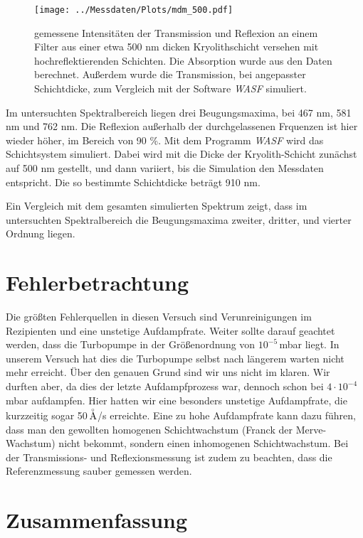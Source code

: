 \documentclass[10pt,twoside]{article}
\renewcommand{\1}{^{-1}}
\renewcommand{\2}{^{-2}}
\newcommand{\3}{^{-3}}
\newcommand{\4}{^{-4}}
\newcommand{\5}{^{-5}}
\newcommand{\6}{^{-6}}
\newcommand{\7}{^{-7}}
\newcommand{\8}{^{-8}}
\newcommand{\9}{^{-9}}
\begin{document}
\begin{figure}[h]
\centering
\texttt{[image: ../Messdaten/Plots/mdm\_500.pdf]} 
\caption{gemessene Intensitäten der Transmission und Reflexion an einem Filter aus einer etwa 500 nm dicken Kryolithschicht versehen mit hochreflektierenden Schichten. Die Absorption wurde aus den Daten berechnet. Außerdem wurde die Transmission, bei angepasster Schichtdicke, zum Vergleich mit der Software \textit{WASF} simuliert.}
\label{fig:mdm_500}
\end{figure}

Im untersuchten Spektralbereich liegen drei Beugungsmaxima, bei 467 nm, 581 nm und 762 nm.
Die Reflexion außerhalb der durchgelassenen Frquenzen ist hier wieder höher, im Bereich von 90 \%.
Mit dem Programm \textit{WASF} wird das Schichtsystem simuliert.
Dabei wird mit die Dicke der Kryolith-Schicht zunächst auf 500 nm gestellt, und dann variiert, bis die Simulation den Messdaten entspricht. Die so bestimmte Schichtdicke beträgt 910 nm.

Ein Vergleich mit dem gesamten simulierten Spektrum zeigt, dass im untersuchten Spektralbereich die Beugungsmaxima zweiter, dritter, und vierter Ordnung liegen.

\section{Fehlerbetrachtung}

Die größten Fehlerquellen in diesen Versuch sind Verunreinigungen im Rezipienten und eine unstetige Aufdampfrate. Weiter sollte darauf geachtet werden, 
dass die Turbopumpe in der Größenordnung von $10^{-5}$\,mbar liegt. In unserem Versuch hat dies die Turbopumpe selbst nach längerem warten nicht mehr erreicht. Über den genauen Grund sind wir uns nicht im klaren. Wir durften aber, da dies der letzte Aufdampfprozess war, dennoch schon bei $4\cdot 10^{-4}$\,mbar aufdampfen. 
Hier hatten wir eine besonders unstetige Aufdampfrate, die kurzzeitig sogar 50\,$\buildrel _{\circ} \over {\mathrm{A}}$/s erreichte. 
Eine zu hohe Aufdampfrate kann dazu führen, dass man den gewollten homogenen Schichtwachstum (Franck der Merve-Wachstum) nicht bekommt, sondern einen inhomogenen Schichtwachstum. Bei der Transmissions- und Reflexionsmessung ist zudem zu beachten, dass die Referenzmessung sauber gemessen werden.

\newpage

\section{Zusammenfassung}
\end{document}
